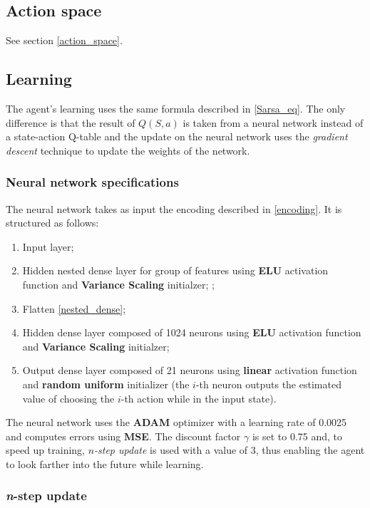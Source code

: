 \documentclass{article}
\begin{document}
\subsection{Action space}

See section \ref{action_space}.

\subsection{Learning}

The agent's learning uses the same formula described in \ref{Sarsa_eq}.
The only difference is that the result of $Q(S, a)$ is taken from a neural network instead of a state-action Q-table and the update on the neural network uses the \textit{gradient descent} technique to update the weights of the network.

\subsubsection{Neural network specifications}

The neural network takes as input the encoding described in \ref{encoding}.
It is structured as follows:
\begin{enumerate}
    \item Input layer;
    \item Hidden nested dense layer for group of features using \textbf{ELU} activation function and \textbf{Variance Scaling} initialzer; \label{nested_dense};
    \item Flatten \ref{nested_dense};
    \item Hidden dense layer composed of 1024 neurons using \textbf{ELU} activation function and \textbf{Variance Scaling} initialzer;
    \item Output dense layer composed of 21 neurons using \textbf{linear} activation function and \textbf{random uniform} initializer (the $i$-th neuron outputs the estimated value of choosing the $i$-th action while in the input state).
\end{enumerate}
The neural network uses the \textbf{ADAM} optimizer with a learning rate of 0.0025 and computes errors using \textbf{MSE}.
The discount factor $\gamma$ is set to 0.75 and, to speed up training, $n$\textit{-step update} is used with a value of 3, thus enabling the agent to look farther into the future while learning.

\subsubsection{\textit{n}-step update}
\end{document}

